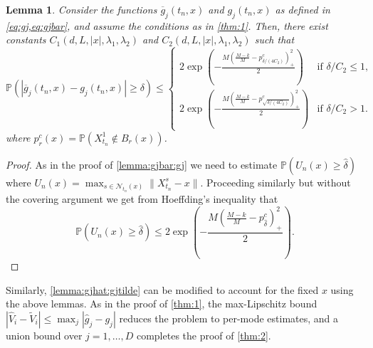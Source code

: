 \documentclass[11pt,reqno,a4paper]{amsart}
\newtheorem{lemma}[theorem]{Lemma}
\theoremstyle{definition}
\numberwithin{equation}{section}
\newcommand{\widebar}[1]{\overline{#1}}
\renewcommand{\P}{\mathbb{P}}
\DeclareMathOperator{\1}{\mathbbm{1}}
\begin{document}
\begin{lemma} \label{lemma:gjbar:gj:2}
  Consider the functions $\widebar{g}_j(t_n,x)$ and $g_j(t_n,x)$ as defined in \cref{eq:gj,eq:gjbar}, and assume the conditions as in \cref{thm:1}.
  Then, there exist constants $C_1(d, L,|x|,\lambda_1,\lambda_2)$ and $C_2(d, L,|x|,\lambda_1,\lambda_2)$ such that
  \begin{equation*}
    \P(|\widebar{g}_j(t_n,x) - g_j(t_n,x)| \geq \delta)
    \leq
    \begin{cases}
      2 \exp \left (-\frac{M \left (\frac{M-k}{M} - p_{\delta/(4 C_2)}^c \right )_+^2}{2} \right )        & \text{if } \delta/C_2 \leq 1,
      \\
      2 \exp \left (-\frac{M \left (\frac{M-k}{M} - p_{\sqrt{\delta/(4 C_2)}}^c \right )_+^2}{2} \right ) & \text{if } \delta/C_2 > 1.
    \end{cases}
  \end{equation*}
  where $p_{r}^c(x) = \P(X_{t_n}^{1} \not \in B_{r}(x))$.
\end{lemma}
\begin{proof}
  As in the proof of \cref{lemma:gjbar:gj} we need to estimate
  $\P(U_n(x) \geq \hat \delta)$ where $U_n(x) = \max_{s \in \mathcal{N}_{t_n}(x)} \|X_{t_n}^{s} - x\|$. Proceeding similarly but without the covering argument we get from Hoeffding's inequality that
  \begin{equation*}
    \P(U_n(x) \geq \hat \delta) \leq 2 \exp \left (-\frac{M \left (\frac{M-k}{M} - p_{\hat \delta}^c \right )_+^2}{2} \right ).
  \end{equation*}
\end{proof}

Similarly, \cref{lemma:gjhat:gjtilde} can be modified to account for the fixed $x$ using the above lemmas. As in the proof of \cref{thm:1}, the max-Lipschitz bound $|\widehat{V}_i - \widetilde{V}_i| \leq \max_j|\widehat{g}_j - g_j|$ reduces the problem to per-mode estimates, and a union bound over $j = 1,\dots,D$ completes the proof of \cref{thm:2}.
\end{document}
